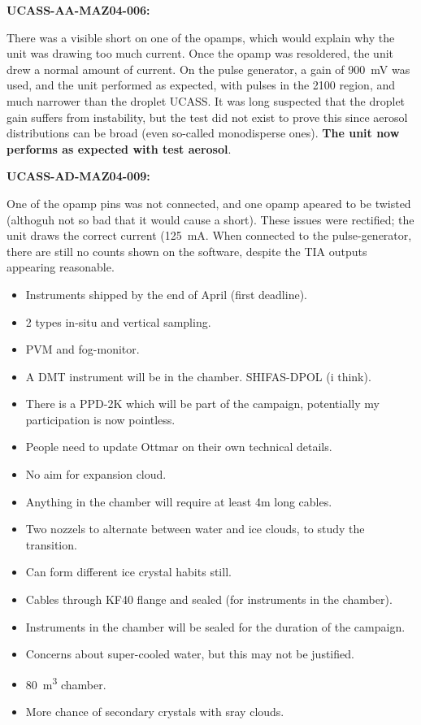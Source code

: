 \textbf{UCASS-AA-MAZ04-006:}

There was a visible short on one of the opamps, which would explain why the unit was drawing too much current. Once the opamp was resoldered, the unit drew a normal amount of current. On the pulse generator, a gain of \SI{900}{\milli\volt} was used, and the unit performed as expected, with pulses in the 2100 region, and much narrower than the droplet UCASS. It was long suspected that the droplet gain suffers from instability, but the test did not exist to prove this since aerosol distributions can be broad (even so-called monodisperse ones). \textbf{The unit now performs as expected with test aerosol}.

\textbf{UCASS-AD-MAZ04-009:}

One of the opamp pins was not connected, and one opamp apeared to be twisted (althoguh not so bad that it would cause a short). These issues were rectified; the unit draws the correct current (\SI{125}{\milli\ampere}. When connected to the pulse-generator, there are still no counts shown on the software, despite the TIA outputs appearing reasonable.




\begin{itemize}
\item Instruments shipped by the end of April (first deadline).
\item 2 types in-situ and vertical sampling.
\item PVM and fog-monitor.
\item A DMT instrument will be in the chamber. SHIFAS-DPOL (i think).
\item There is a PPD-2K which will be part of the campaign, potentially my participation is now pointless.
\item People need to update Ottmar on their own technical details.
\item No aim for expansion cloud.
\item Anything in the chamber will require at least 4m long cables.
\item Two nozzels to alternate between water and ice clouds, to study the transition.
\item Can form different ice crystal habits still.
\item Cables through KF40 flange and sealed (for instruments in the chamber).
\item Instruments in the chamber will be sealed for the duration of the campaign.
\item Concerns about super-cooled water, but this may not be justified.
\item \SI{80}{\cubic\metre} chamber.
\item More chance of secondary crystals with sray clouds.
\end{itemize}




